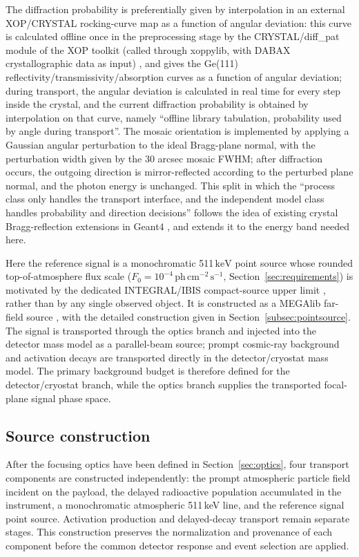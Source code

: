 \documentclass[11pt]{article}
\newcommand{\keV}{\ensuremath{\,\mathrm{keV}}}
\newcommand{\phcms}{\ensuremath{\,\mathrm{ph\,cm^{-2}\,s^{-1}}}}
\newcommand{\fzero}{F_{0}}
\begin{document}
The diffraction probability is preferentially given by interpolation in an external XOP/CRYSTAL rocking-curve map as a function of angular deviation: this curve is calculated offline once in the preprocessing stage by the CRYSTAL/diff\_pat module of the XOP toolkit (called through xoppylib, with DABAX crystallographic data as input) \cite{SanchezDelRio2011XOP}, and gives the Ge(111) reflectivity/transmissivity/absorption curves as a function of angular deviation; during transport, the angular deviation is calculated in real time for every step inside the crystal, and the current diffraction probability is obtained by interpolation on that curve, namely ``offline library tabulation, probability used by angle during transport''. The mosaic orientation is implemented by applying a Gaussian angular perturbation to the ideal Bragg-plane normal, with the perturbation width given by the 30 arcsec mosaic FWHM; after diffraction occurs, the outgoing direction is mirror-reflected according to the perturbed plane normal, and the photon energy is unchanged. This split in which the ``process class only handles the transport interface, and the independent model class handles probability and direction decisions'' follows the idea of existing crystal Bragg-reflection extensions in Geant4 \cite{Guan2023BraggReflection,Reiazi2025G4BraggReflection}, and extends it to the energy band needed here.

Here the reference signal is a monochromatic 511\keV{} point source whose
rounded top-of-atmosphere flux scale
($\fzero=10^{-4}\phcms$, Section~\ref{sec:requirements}) is motivated by the
dedicated INTEGRAL/IBIS compact-source upper limit \cite{DeCesare2011}, rather
than by any single observed object. It is constructed as a MEGAlib far-field source
\cite{Zoglauer2006}, with the detailed construction given in
Section~\ref{subsec:pointsource}. The signal is transported through the optics
branch and injected into the detector mass model as a parallel-beam source;
prompt cosmic-ray background and activation decays are transported directly in
the detector/cryostat mass model. The primary background budget is therefore
defined for the detector/cryostat branch, while the optics branch supplies the
transported focal-plane signal phase space.

\subsection{Source construction}
\label{sec:background}

After the focusing optics have been defined in Section~\ref{sec:optics}, four
transport components are constructed independently: the prompt atmospheric
particle field incident on the payload, the delayed radioactive population
accumulated in the instrument, a monochromatic atmospheric 511\,keV line, and the
reference signal point source. Activation production and delayed-decay transport
remain separate stages. This construction preserves the normalization and
provenance of each component before the common detector response and event
selection are applied.
\end{document}
